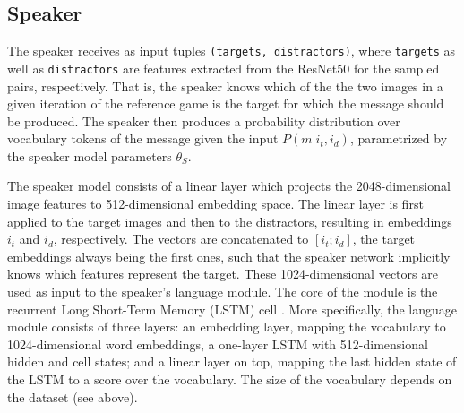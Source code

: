 \subsection{Speaker}
The speaker receives as input tuples \texttt{(targets, distractors)}, where \texttt{targets} as well as \texttt{distractors} are features extracted from the ResNet50 for the sampled pairs, respectively. That is, the speaker knows which of the the two images in a given iteration of the reference game is the target for which the message should be produced. The speaker then produces a probability distribution over vocabulary tokens of the message given the input $P(m | i_t, i_d)$, parametrized by the speaker model parameters $\theta_S$.

The speaker model consists of a linear layer which projects the 2048-dimensional image features to 512-dimensional embedding space.  The linear layer is first applied to the target images and then to the distractors, resulting in embeddings $i_t$ and $i_d$, respectively. The vectors are concatenated to $[i_t; i_d]$, the target embeddings always being the first ones, such that the speaker network implicitly knows which features represent the target. These 1024-dimensional vectors are used as input to the speaker's language module. The core of the module is the recurrent Long Short-Term Memory (LSTM) cell \parencite{hochreiter1997long}. More specifically, the language module consists of three layers: an embedding layer, mapping the vocabulary to 1024-dimensional word embeddings, a one-layer LSTM with 512-dimensional hidden and cell states; and a linear layer on top, mapping the last hidden state of the LSTM to a score over the vocabulary. The size of the vocabulary depends on the dataset (see above).

